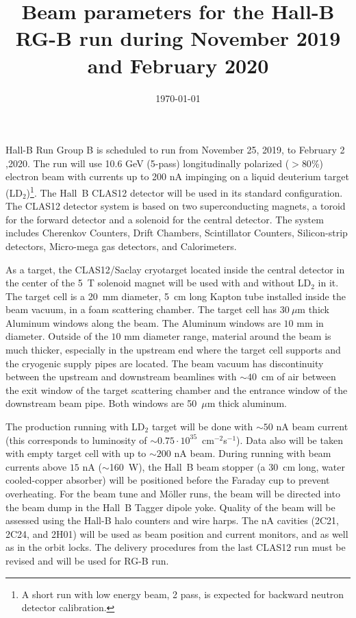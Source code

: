 \documentclass[12pt]{article}
\begin{document}
\title{Beam parameters for the Hall-B RG-B run during November 2019 and February 2020}
\author{}
\date{\today}
\maketitle

Hall-B Run Group B is scheduled to run from November 25, 2019, to February 2 ,2020. The run will use 10.6 GeV (5-pass) longitudinally polarized ($>80$\%) electron beam with currents up to 200 nA impinging on a liquid deuterium target (LD$_2$)\footnote{A short run with low energy beam, 2 pass, is expected for backward neutron detector calibration.}. The Hall~B CLAS12 detector will be used in its standard configuration. The CLAS12 detector system is based on two superconducting magnets, a toroid for the forward detector and a solenoid for the central detector. The system includes Cherenkov Counters, Drift Chambers, Scintillator Counters, Silicon-strip detectors, Micro-mega gas detectors, and Calorimeters. 

As a target, the CLAS12/Saclay cryotarget located inside the central detector in the center of the 5~T solenoid magnet will be used with and without LD$_2$ in it. 
The target cell is a 20~mm diameter, 5~cm long Kapton tube installed inside the beam vacuum, in a foam scattering chamber. The target cell has $30~\mu$m thick Aluminum windows along the beam. The Aluminum windows are $10$ mm in diameter. Outside of the $10$ mm diameter range, material around the beam is much thicker, especially in the upstream end where the target cell supports and the cryogenic supply pipes are located. The beam vacuum has discontinuity between the upstream and downstream beamlines with $\sim40$~cm of air between the exit window of the target scattering chamber and the entrance window of the downstream beam pipe. 
Both windows are 50~$\mu$m thick aluminum. 

The production running with LD$_2$ target will be done with $\sim 50$ nA beam current (this corresponds to luminosity of $\sim 0.75\cdot 10^{35}$~cm$^{-2}$s$^{-1}$). Data also will be taken with empty target cell with up to $\sim 200$ nA beam. During running with beam currents above $15$ nA  ($\sim$160~W), the Hall~B beam stopper (a 30~cm long, water cooled-copper absorber) will be positioned before the Faraday cup to prevent overheating. 
For the beam tune and M{\"o}ller runs, the beam will be directed into the beam dump in the Hall~B Tagger dipole yoke. Quality of the beam will be assessed using the Hall-B halo counters and wire harps. The nA cavities (2C21, 2C24, and 2H01) will be used as beam position and current monitors, and as well as in the orbit locks. The delivery procedures from the last CLAS12 run must be revised and will be used for RG-B run.
\end{document}
